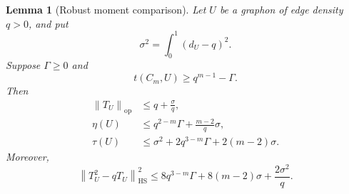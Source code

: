 \documentclass[11pt]{article}
\newtheorem{lemma}{Lemma}[section]
\theoremstyle{remark}
\newcommand{\op}{\mathrm{op}}
\newcommand{\HS}{\mathrm{HS}}
\newcommand{\norm}[1]{\left\lVert #1\right\rVert}
\begin{document}
\begin{lemma}[Robust moment comparison]\label{lem:spectral}
Let $U$ be a graphon of edge density $q>0$, and put
\[
 \sigma^2=\int_0^1(d_U-q)^2.
\]
Suppose $\Gamma\geq0$ and
\begin{equation}\label{eq:moment-hypothesis}
 t(C_m,U)\geq q^{m-1}-\Gamma.
\end{equation}
Then
\begin{align}
 \norm{T_U}_{\op}
 &\leq q+\frac{\sigma}{q},\label{eq:operator-bound}\\
 \eta(U)
 &\leq q^{2-m}\Gamma+\frac{m-2}{q}\sigma,\label{eq:eta-bound}\\
 \tau(U)
 &\leq\sigma^2+2q^{3-m}\Gamma+2(m-2)\sigma.\label{eq:tau-bound}
\end{align}
Moreover,
\begin{equation}\label{eq:HS-bound}
 \norm{T_U^2-qT_U}_{\HS}^2
 \leq8q^{3-m}\Gamma+8(m-2)\sigma+\frac{2\sigma^2}{q}.
\end{equation}
\end{lemma}
\end{document}
